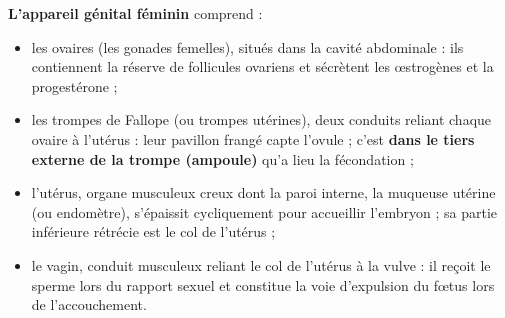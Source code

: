\documentclass[11pt]{article}
\newcommand{\cle}[1]{{\popxbold\color{popdark}#1}}
\begin{document}
\textbf{L'appareil génital féminin} comprend :
\begin{itemize}
\item les \cle{ovaires} (les gonades femelles), situés dans la cavité abdominale : ils contiennent la réserve de follicules ovariens et sécrètent les \cle{œstrogènes} et la \cle{progestérone} ;
\item les \cle{trompes de Fallope} (ou trompes utérines), deux conduits reliant chaque ovaire à l'utérus : leur pavillon frangé capte l'ovule ; c'est \textbf{dans le tiers externe de la trompe (ampoule)} qu'a lieu la fécondation ;
\item l'\cle{utérus}, organe musculeux creux dont la paroi interne, la \cle{muqueuse utérine} (ou endomètre), s'épaissit cycliquement pour accueillir l'embryon ; sa partie inférieure rétrécie est le \cle{col de l'utérus} ;
\item le \cle{vagin}, conduit musculeux reliant le col de l'utérus à la vulve : il reçoit le sperme lors du rapport sexuel et constitue la voie d'expulsion du fœtus lors de l'accouchement.
\end{itemize}
\end{document}
